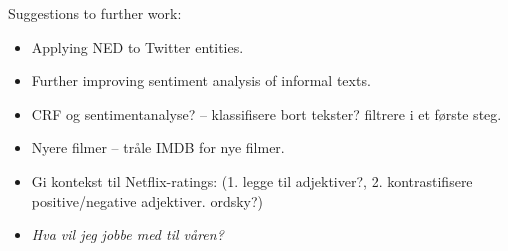 Suggestions to further work:

\begin{itemize}
  \item Applying NED to Twitter entities.
  \item Further improving sentiment analysis of informal texts.
  \item CRF og sentimentanalyse? -- klassifisere bort tekster? filtrere i et første steg.
  \item Nyere filmer -- tråle IMDB for nye filmer.
  \item
    Gi kontekst til Netflix-ratings:
    (1. legge til adjektiver?, 2. kontrastifisere positive/negative adjektiver. ordsky?)

  \item \emph{Hva vil jeg jobbe med til våren?}
\end{itemize}

